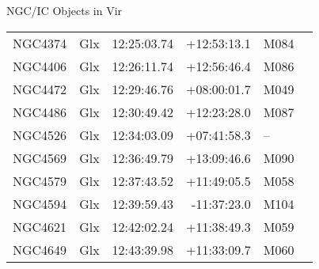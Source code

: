 \begin{block}{NGC/IC Objects in Vir}
  \centering
  \begin{tabularx}{\textwidth}{llrrll} 
    NGC4374 & Glx & 12:25:03.74 & +12:53:13.1  & M084 \\ 
    NGC4406 & Glx & 12:26:11.74 & +12:56:46.4  & M086 \\ 
    NGC4472 & Glx & 12:29:46.76 & +08:00:01.7  & M049 \\ 
    NGC4486 & Glx & 12:30:49.42 & +12:23:28.0  & M087 \\ 
    NGC4526 & Glx & 12:34:03.09 & +07:41:58.3  & -- \\ 
    NGC4569 & Glx & 12:36:49.79 & +13:09:46.6  & M090 \\ 
    NGC4579 & Glx & 12:37:43.52 & +11:49:05.5  & M058 \\ 
    NGC4594 & Glx & 12:39:59.43 & -11:37:23.0  & M104 \\ 
    NGC4621 & Glx & 12:42:02.24 & +11:38:49.3  & M059 \\ 
    NGC4649 & Glx & 12:43:39.98 & +11:33:09.7  & M060 \\ 
  \end{tabularx}
\end{block}